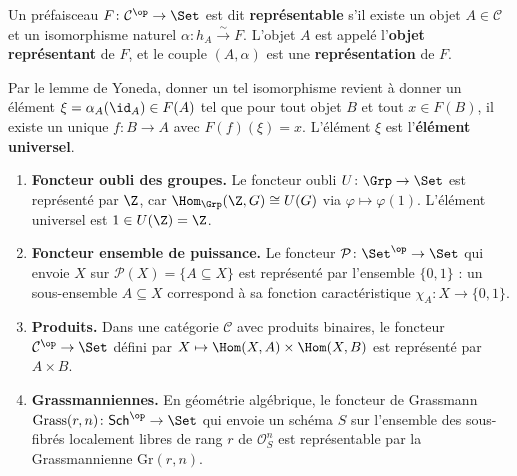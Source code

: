 \begin{definition}\label{def:foncteur-representable}
Un préfaisceau $F \colon \mathcal{C}^{\op} \to \Set$ est dit
\textbf{représentable} s'il existe un objet $A \in \mathcal{C}$
et un isomorphisme naturel $\alpha \colon h_A \xrightarrow{\sim} F$.
L'objet $A$ est appelé l'\textbf{objet représentant} de $F$,
et le couple $(A, \alpha)$ est une \textbf{représentation} de $F$.

Par le lemme de Yoneda, donner un tel isomorphisme revient
à donner un élément $\xi = \alpha_A(\id_A) \in F(A)$
tel que pour tout objet $B$ et tout $x \in F(B)$,
il existe un unique $f \colon B \to A$ avec $F(f)(\xi) = x$.
L'élément $\xi$ est l'\textbf{élément universel}.
\end{definition}

\begin{exemple}\label{ex:representables}
\begin{enumerate}[label=(\roman*)]
\item \textbf{Foncteur oubli des groupes.}
    Le foncteur oubli $U \colon \Grp \to \Set$ est représenté par $\Z$,
    car $\Hom_{\Grp}(\Z, G) \cong U(G)$ via $\varphi \mapsto \varphi(1)$.
    L'élément universel est $1 \in U(\Z) = \Z$.

\item \textbf{Foncteur ensemble de puissance.}
    Le foncteur $\mathcal{P} \colon \Set^{\op} \to \Set$ qui envoie
    $X$ sur $\mathcal{P}(X) = \{A \subseteq X\}$ est représenté
    par l'ensemble $\{0, 1\}$ : un sous-ensemble $A \subseteq X$
    correspond à sa fonction caractéristique $\chi_A \colon X \to \{0,1\}$.

\item \textbf{Produits.}
    Dans une catégorie $\mathcal{C}$ avec produits binaires, le foncteur
    $\mathcal{C}^{\op} \to \Set$ défini par
    $X \mapsto \Hom(X, A) \times \Hom(X, B)$
    est représenté par $A \times B$.

\item \textbf{Grassmanniennes.}
    En géométrie algébrique, le foncteur de Grassmann
    $\mathrm{Grass}(r, n) \colon \mathsf{Sch}^{\op} \to \Set$
    qui envoie un schéma $S$ sur l'ensemble des sous-fibrés localement
    libres de rang $r$ de $\mathcal{O}_S^n$ est représentable par
    la Grassmannienne $\mathrm{Gr}(r, n)$.
\end{enumerate}
\end{exemple}

